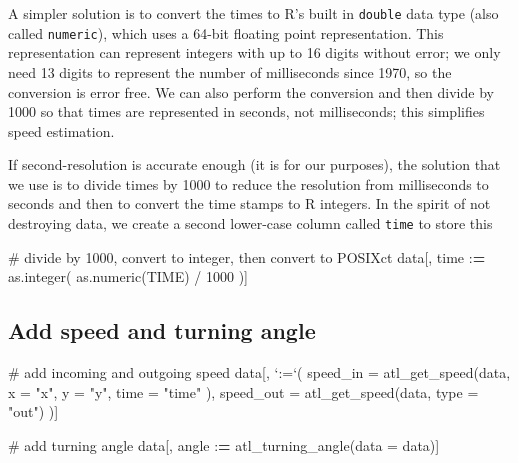 \documentclass[]{scrreprt}
\newenvironment{Shaded}{}{}
\newcommand{\CommentTok}[1]{\textcolor[rgb]{0.00,0.50,0.00}{#1}}
\newcommand{\DataTypeTok}[1]{#1}
\newcommand{\DecValTok}[1]{#1}
\newcommand{\ErrorTok}[1]{\textcolor[rgb]{1.00,0.00,0.00}{\textbf{#1}}}
\newcommand{\KeywordTok}[1]{\textcolor[rgb]{0.00,0.00,1.00}{#1}}
\newcommand{\NormalTok}[1]{#1}
\newcommand{\OperatorTok}[1]{#1}
\newcommand{\StringTok}[1]{\textcolor[rgb]{0.00,0.50,0.50}{#1}}
\begin{document}
A simpler solution is to convert the times to R's built in \texttt{double} data type (also called \texttt{numeric}), which uses a 64-bit floating point representation. This representation can represent integers with up to 16 digits without error; we only need 13 digits to represent the number of milliseconds since 1970, so the conversion is error free. We can also perform the conversion and then divide by 1000 so that times are represented in seconds, not milliseconds; this simplifies speed estimation.

If second-resolution is accurate enough (it is for our purposes), the solution that we use is to divide times by 1000 to reduce the resolution from milliseconds to seconds and then to convert the time stamps to R integers.
In the spirit of not destroying data, we create a second lower-case column called \texttt{time} to store this

\begin{Shaded}
\begin{Highlighting}[]
\CommentTok{# divide by 1000, convert to integer, then convert to POSIXct}
\NormalTok{data[, time }\OperatorTok{:}\ErrorTok{=}\StringTok{ }\KeywordTok{as.integer}\NormalTok{(}
  \KeywordTok{as.numeric}\NormalTok{(TIME) }\OperatorTok{/}\StringTok{ }\DecValTok{1000}
\NormalTok{)]}
\end{Highlighting}
\end{Shaded}

\hypertarget{add-speed-and-turning-angle}{%
\subsection{Add speed and turning angle}\label{add-speed-and-turning-angle}}

\begin{Shaded}
\begin{Highlighting}[]
\CommentTok{# add incoming and outgoing speed}
\NormalTok{data[, }\StringTok{`}\DataTypeTok{:=}\StringTok{`}\NormalTok{(}
  \DataTypeTok{speed_in =} \KeywordTok{atl_get_speed}\NormalTok{(data,}
    \DataTypeTok{x =} \StringTok{"x"}\NormalTok{,}
    \DataTypeTok{y =} \StringTok{"y"}\NormalTok{,}
    \DataTypeTok{time =} \StringTok{"time"}
\NormalTok{  ),}
  \DataTypeTok{speed_out =} \KeywordTok{atl_get_speed}\NormalTok{(data, }\DataTypeTok{type =} \StringTok{"out"}\NormalTok{)}
\NormalTok{)]}

\CommentTok{# add turning angle}
\NormalTok{data[, angle }\OperatorTok{:}\ErrorTok{=}\StringTok{ }\KeywordTok{atl_turning_angle}\NormalTok{(}\DataTypeTok{data =}\NormalTok{ data)]}
\end{Highlighting}
\end{Shaded}
\end{document}
